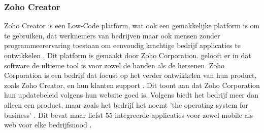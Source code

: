 \subsubsection*{Zoho Creator}
Zoho Creator is een Low-Code platform, wat ook een gemakkelijke platform is om te gebruiken, dat werknemers van bedrijven maar ook mensen zonder programmeerervaring toestaan
om eenvoudig krachtige bedrijf applicaties te ontwikkelen \autocite{Computer2022}. Dit platform is gemaakt door Zoho Corporation. \textcite{ZohoCorporation2024a} gelooft er in dat software de ultieme tool is voor zowel de handen als de hersenen.
Zoho Corporation is een bedrijf dat focust op het verder ontwikkelen van hun product, zoals Zoho Creator, en hun klanten support \autocite{ZohoCorporation2024a}. Dit toont aan dat Zoho Corporation
hun updatebeleid volgens hun website goed is. Volgens \textcite{ZohoCorporation2024a} biedt het bedrijf meer dan alleen een product, maar zoals het bedrijf het noemt 'the operating system for business' \autocite{ZohoCorporation2024a}.
Dit bevat maar liefst 55 integreerde applicaties voor zowel mobile als web voor elke bedrijfsnood \autocite{ZohoCorporation2024a}.

